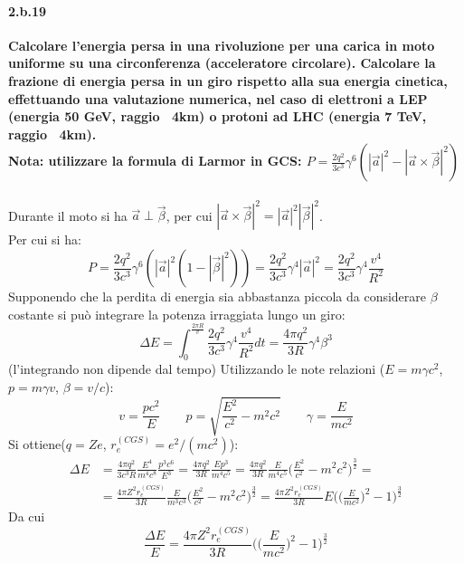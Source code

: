 \documentclass[twoside]{article}
\begin{document}
\paragraph{2.b.19}\textbf{Calcolare l’energia persa in una rivoluzione per una carica in moto uniforme su una circonferenza (acceleratore circolare). Calcolare la frazione di energia persa in un giro rispetto alla sua energia cinetica, effettuando una valutazione numerica, nel caso di elettroni a LEP (energia 50 GeV, raggio ~4km) o protoni ad LHC (energia 7 TeV, raggio ~4km). \\Nota: utilizzare la formula di Larmor in GCS:
$P = \frac{2q^2}{3c^3}\gamma^6(|\vec{a}|^2-|\vec{a}\times \vec{\beta}|^2)$}\\ \\
Durante il moto si ha $\vec{a}\perp\vec{\beta}$, per cui $|\vec{a}\times\vec{\beta}|^2=|\vec{a}|^2|\vec{\beta}|^2$.\\
Per cui si ha:
\begin{equation}
    P=\frac{2q^2}{3c^3}\gamma^6(|\vec{a}|^2(1-|\vec{\beta}|^2))=\frac{2q^2}{3c^3}\gamma^4|\vec{a}|^2=\frac{2q^2}{3c^3}\gamma^4 \frac{v^4}{R^2}
\end{equation}
Supponendo che la perdita di energia sia abbastanza piccola da considerare $\beta$ costante si può integrare la potenza irraggiata lungo un giro:
\begin{equation}
    \Delta E=\int_0^{\frac{2\pi R}{v}}\frac{2q^2}{3c^3}\gamma^4\frac{v^4}{R^2}dt=\frac{4\pi q^2}{3R}\gamma^4\beta^3
\end{equation}
(l'integrando non dipende dal tempo)
Utilizzando le note relazioni ($E=m\gamma c^2$, $p=m\gamma v$, $\beta=v/c$):
\begin{equation}
    v=\frac{pc^2}{E} \qquad p=\sqrt{\frac{E^2}{c^2}-m^2c^2} \qquad \gamma=\frac{E}{mc^2}
\end{equation}
Si ottiene($q=Z e$, $r_e^{(CGS)}= e^2/(mc^2)$):
\begin{align}
    \Delta E&=\frac{4\pi q^2}{3c^3 R}\frac{E^4}{m^4c^8}\frac{p^3c^6}{E^3}=\frac{4\pi q^2}{3R}\frac{Ep^3}{m^4c^5}=\frac{4\pi q^2}{3R}\frac{E}{m^4c^5}\biggl(\frac{E^2}{c^2}-m^2c^2\biggr)^{\frac{3}{2}}=\\
    &=\frac{4\pi Z^2r_e^{(CGS)}}{3R}\frac{E}{m^3 c^3}\biggl(\frac{E^2}{c^2}-m^2c^2\biggr)^{\frac{3}{2}}=\frac{4\pi Z^2r_e^{(CGS)}}{3R}E\biggl(\biggl(\frac{E}{mc^2}\biggr)^2-1\biggr)^{\frac{3}{2}}
\end{align}
Da cui
\begin{equation}
    \frac{\Delta E}{E}=\frac{4\pi Z^2r_e^{(CGS)}}{3R}\biggl(\biggl(\frac{E}{mc^2}\biggr)^2-1\biggr)^{\frac{3}{2}}
\end{equation}
\end{document}
